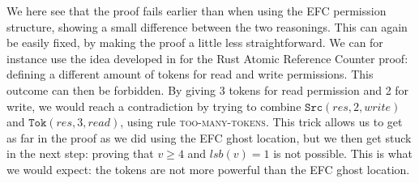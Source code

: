 We here see that the proof fails earlier than when using the EFC permission structure, showing a small difference between the two reasonings. This can again be easily fixed, by making the proof a little less straightforward. We can for instance use the idea developed in \cite{pascal} for the Rust Atomic Reference Counter proof: defining a different amount of tokens for read and write permissions. This outcome can then be forbidden. By giving 3 tokens for read permission and 2 for write, we would reach a contradiction by trying to combine  $\texttt{Src}(res, 2, write)$ and $\texttt{Tok}(res, 3, read)$, using rule \textsc{too-many-tokens}. This trick allows us to get as far in the proof as we did using the EFC ghost location, but we then get stuck in the next step: proving that $v \geq 4$ and $lsb(v) = 1$ is not possible. This is what we would expect: the tokens are not more powerful than the EFC ghost location.
